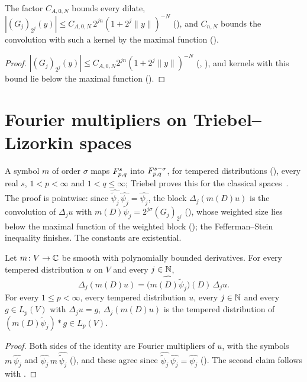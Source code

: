The factor $C_{A,0,N}$ bounds every dilate,
$|(G_j)_{2^j}(y)| \leq C_{A,0,N} \, 2^{jn} (1 + 2^j \|y\|)^{-N}$ (), and
$C_{n,N}$ bounds the convolution with such a kernel by the maximal function
().

\begin{proof}
\leanok
$|(G_j)_{2^j}(y)| \leq C_{A,0,N} 2^{jn} (1 + 2^j \|y\|)^{-N}$ (,
), and kernels with this bound lie below the maximal
function ().
\end{proof}

\section{Fourier multipliers on Triebel--Lizorkin spaces}
\label{sec:tl-multipliers}

A symbol $m$ of order $\sigma$ maps $F^{s}_{p,q}$ into $F^{s-\sigma}_{p,q}$, for tempered
distributions (), every real $s$, $1 < p < \infty$ and $1 < q \leq \infty$;
Triebel proves this for the classical spaces~\cite[pp.~73--77]{Triebel}. The proof is
pointwise: since $\widehat{\tilde\psi_j} \, \widehat{\psi_j} = \widehat{\psi_j}$, the block
$\Delta_j(m(D) u)$ is the convolution of $\Delta_j u$ with $m(D) \tilde\psi_j =
2^{j\sigma} (G_j)_{2^j}$ (), whose weighted size lies below the maximal
function of the weighted block (); the Fefferman--Stein
inequality finishes. The constants are existential.

\begin{lemma}
\label{lem:distrib-block-multiplier}
\leanok
{}
Let $m \colon V \to \mathbb{C}$ be smooth with polynomially bounded derivatives. For every tempered
distribution $u$ on $V$ and every $j \in \mathbb{N}$,
\[
  \Delta_j (m(D) u) = \bigl(\widehat{m(D) \tilde\psi_j}\bigr)(D) \, \Delta_j u .
\]
For every $1 \leq p < \infty$, every tempered distribution $u$, every $j \in \mathbb{N}$ and every
$g \in L_p(V)$ with $\Delta_j u = g$, $\Delta_j(m(D) u)$ is the tempered distribution of
$(m(D) \tilde\psi_j) * g \in L_p(V)$.
\end{lemma}

\begin{proof}
\leanok
Both sides of the identity are Fourier multipliers of $u$, with the symbols
$m \, \widehat{\psi_j}$ and $\widehat{\psi_j} \, m \, \widehat{\tilde\psi_j}$
(), and these agree since
$\widehat{\tilde\psi_j} \, \widehat{\psi_j} = \widehat{\psi_j}$ ().
The second claim follows with .
\end{proof}

